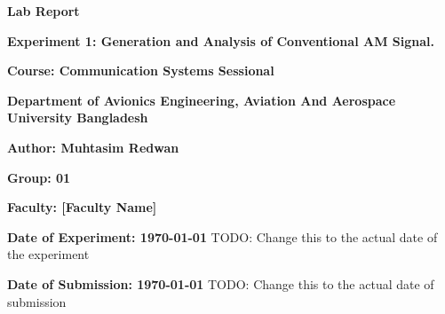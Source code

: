 \begin{titlepage}
    \centering
    \vspace*{1in}
    
    \Huge
    \textbf{Lab Report}
    
    \vspace{0.5in}
    \LARGE
    \textbf{Experiment 1: Generation and Analysis of Conventional AM Signal.}
    
    \vspace{1.5in}
    
    \textbf{Course: Communication Systems Sessional}
    
    \textbf{Department of Avionics Engineering, Aviation And Aerospace University Bangladesh }
    
    \vspace{0.5in}
    
    \textbf{Author: Muhtasim Redwan}

    \textbf{Group: 01}
    
    \vspace{0.5in}
    
    \textbf{Faculty: [Faculty Name]}
    
    \vfill
    
    \Large
    \textbf{Date of Experiment: \today} TODO: Change this to the actual date of the experiment
    
    \textbf{Date of Submission: \today} TODO: Change this to the actual date of submission
    
\end{titlepage}